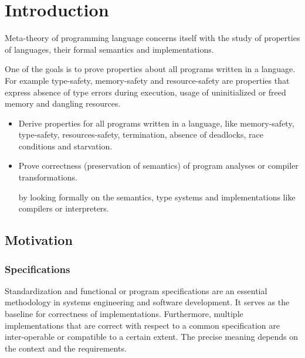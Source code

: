 { %

\newcommand{\stlcbool}{\ensuremath{\lambda_{\mathbb{B}}}\xspace}
\newcommand{\bool}{\text{bool}}
\newcommand{\true}{\textbf{true}\xspace}
\newcommand{\false}{\textbf{false}\xspace}
\newcommand{\ite}[3]{\textbf{if}~{#1}~\textbf{then}~{#2}~\textbf{else}~{#3}}
\newcommand{\typing}[3]{{#1} \vdash {#2} : {#3}}
\renewcommand{\eval}[2]{{#1} \longrightarrow {#2}}
\newcommand{\evals}[2]{{#1} \longrightarrow^* {#2}}

\chapter{Introduction}

Meta-theory of programming language concerns itself with the study of properties
of languages, their formal semantics and implementations.

One of the goals is to prove properties about all programs written in a
language.  For example type-safety, memory-safety and resource-safety are
properties that express absence of type errors during execution, usage of
uninitialized or freed memory and dangling resources.


\begin{itemize}
\item
  Derive properties for all programs written in a language, like memory-safety,
  type-safety, resources-safety, termination, absence of deadlocks, race
  conditions and starvation.

\item
  Prove correctness (preservation of semantics) of program analyses or compiler
  transformations.

  by looking formally on the semantics, type systems and implementations like
  compilers or interpreters.
\end{itemize}

\section{Motivation}

\subsection{Specifications}\label{sec:intro:specification}

Standardization and functional or program specifications are an essential
methodology in systems engineering and software development. It serves as the
baseline for correctness of implementations. Furthermore, multiple
implementations that are correct with respect to a common specification are
inter-operable or compatible to a certain extent. The precise meaning depends on
the context and the requirements.

}
